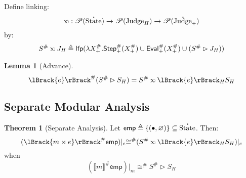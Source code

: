 \documentclass{article}
\theoremstyle{definition}
\newtheorem{lem}{Lemma}[section]
\newtheorem{thm}{Theorem}[section]
\newcommand*{\pset}{\mathscr{P}}
\newcommand*{\A}[1]{\overset{{\,_{\mbox{\Large .}}}}{#1}}
\newcommand*{\Abs}[1]{{#1}^{\#}}
\newcommand*{\State}{\text{State}}
\newcommand*{\Judge}{\text{Judge}}
\newcommand*{\lfp}{\mathsf{lfp}}
\newcommand*{\Step}{\mathsf{Step}}
\newcommand*{\Eval}{\mathsf{Eval}}
\newcommand*{\semlink}{\mathbin{\rotatebox[origin=c]{180}{$\propto$}}}
\newcommand*{\link}[2]{{#1}\rtimes{#2}}
\newcommand*{\mt}{\mathsf{emp}}
\newcommand*{\sembracket}[1]{\lBrack{#1}\rBrack}
\begin{document}
Define linking:
\[\semlink:\pset(\A\State)\rightarrow\pset(\Judge_H)\rightarrow\pset(\A\Judge_+)\]
by:
\[\Abs{S}\semlink J_H\triangleq\lfp(\lambda\Abs{X}_+.\Abs{\Step}_+(\Abs{X}_+)\cup\Abs{\Eval}_+(\Abs{X}_+)\cup(\Abs{S}\rhd J_H))\]
\begin{lem}[Advance]
  \[\Abs{\sembracket{e}}(\Abs{S}\rhd S_H)=\Abs{S}\semlink\sembracket{e}_H S_H\]
\end{lem}
\subsection{Separate Modular Analysis}
\begin{thm}[Separate Analysis]
  Let $\mt\triangleq\{(\bullet,\varnothing)\}\subseteq\A\State$. Then:
  \[(\Abs{\sembracket{\link{m}{e}}}\mt)|_{e}\Abs\cong(\Abs{S}\semlink\sembracket{e}_H S_H)|_{e}\]
  when
  \[(\Abs{\sembracket{m}}\mt)|_{m}\Abs\cong\Abs{S}\rhd S_H\]
\end{thm}
\end{document}
